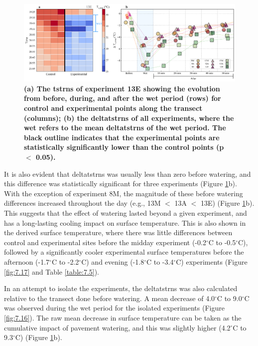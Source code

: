 \documentclass[final,3p,times,authoryear]{elsarticle}
\begin{document}
\begin{figure}
\centering
\includegraphics[trim={0 0 0 0},clip,scale=1.05]{pict016.png}
\caption{\bf (a) The \gls{tstrns} of experiment 13E showing the evolution from before, during, and after the wet period (rows) for control and experimental points along the transect (columns); (b) the \gls{deltatstrns} of all experiments, where the wet refers to the mean \gls{deltatstrns} of the wet period. The black outline indicates that the experimental points are statistically significantly lower than the control points (\gls{p} $<$ 0.05).}
 \label{fig:3.5}
\end{figure}

It is also evident that \gls{deltatstrns} was usually less than zero before watering, and this difference was statistically significant for three experiments (Figure \ref{fig:3.5}b). With the exception of experiment 8M, the magnitude of these before watering differences increased throughout the day (e.g., 13M $<$ 13A $<$ 13E) (Figure \ref{fig:3.5}b). This suggests that the effect of watering lasted beyond a given experiment, and has a long-lasting cooling impact on surface temperature. This is also shown in the derived surface temperature, where there was little differences between control and experimental sites before the midday experiment (-0.2$^{\circ}$C to -0.5$^{\circ}$C), followed by a significantly cooler experimental surface temperatures before the afternoon (-1.7$^{\circ}$C to -2.2$^{\circ}$C) and evening (-1.8$^{\circ}$C to -3.4$^{\circ}$C) experiments (Figure \ref{fig:7.17} and Table \ref{table:7.5}).

In an attempt to isolate the experiments, the \gls{deltatstrns} was also calculated relative to the transect done before watering. A mean decrease of 4.0$^{\circ}$C to 9.0$^{\circ}$C was observed during the wet period for the isolated experiments (Figure \ref{fig:7.16}). The raw mean decrease in surface temperature can be taken as the cumulative impact of pavement watering, and this was slightly higher (4.2$^{\circ}$C to 9.3$^{\circ}$C) (Figure \ref{fig:3.5}b).
\end{document}
